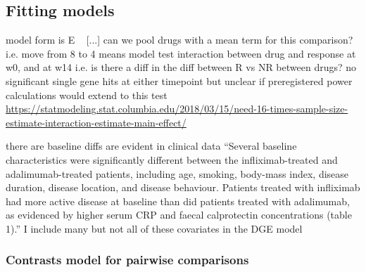 \begin{outline}
\subsection{Fitting  models}

\1 model form is E ~ [...]
\1 can we pool drugs with a mean term for this comparison? i.e. move from 8 to 4 means model
    \2 test interaction between drug and response at w0, and at w14 i.e. is there a diff in the diff between R vs NR between drugs?
    \2 no significant single gene hits at either timepoint
    \2 but unclear if preregistered power calculations would extend to this test \url{https://statmodeling.stat.columbia.edu/2018/03/15/need-16-times-sample-size-estimate-interaction-estimate-main-effect/}

    \2 there are baseline diffs are evident in clinical data 
    \2 “Several baseline characteristics were significantly different between the infliximab-treated and adalimumab-treated patients, including age, smoking, body-mass index, disease duration, disease location, and disease behaviour. Patients treated with infliximab had more active disease at baseline than did patients treated with adalimumab, as evidenced by higher serum CRP and faecal calprotectin concentrations (table 1).” \autocite{kennedy2019PredictorsAntiTNFTreatment}
    \2 I include many but not all of these covariates in the DGE model

\subsubsection{Contrasts model for pairwise comparisons}


\end{outline}
